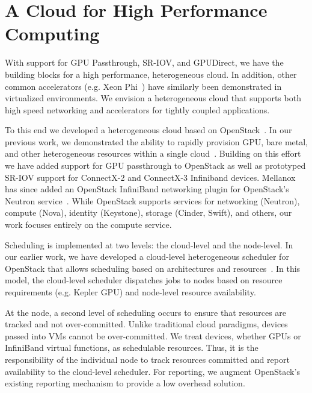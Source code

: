 \section{A Cloud for High Performance Computing}\label{openstack}
With support for GPU Passthrough, SR-IOV, and GPUDirect, we have the building
blocks for a high performance, heterogeneous cloud.  In addition, other common
accelerators (e.g. Xeon Phi~\cite{Phi}) have similarly been demonstrated in
virtualized environments.  We envision a heterogeneous cloud that supports
both high speed networking and accelerators for tightly coupled applications.

To this end we developed a heterogeneous cloud based on
OpenStack~\cite{www-openstack}.  In our previous work, we demonstrated the ability to rapidly provision GPU, bare metal, and other
heterogeneous resources within a single cloud~\cite{crago2011heterogeneous}.
Building on this effort we have added support for GPU passthrough to OpenStack
as well as prototyped SR-IOV support for ConnectX-2 and ConnectX-3 Infiniband devices.
Mellanox  has since added an OpenStack InfiniBand networking plugin for
OpenStack's Neutron service~\cite{ML2}. %
While OpenStack supports services for networking (Neutron), compute (Nova), identity
(Keystone), storage (Cinder, Swift), and others, our work focuses entirely
on the compute service.  

Scheduling is implemented at two levels: the cloud-level and the node-level.  In
our earlier work, we have developed a cloud-level heterogeneous scheduler for OpenStack that 
allows scheduling based on architectures and
resources~\cite{crago2011heterogeneous}.  In this model, the cloud-level
scheduler dispatches jobs to nodes based on resource requirements (e.g. Kepler
GPU) and node-level resource availability.

At the node, a second level of scheduling occurs to ensure that resources are
tracked and not over-committed.  Unlike traditional cloud paradigms, devices
passed into VMs cannot be over-committed.  We treat devices, whether GPUs or
InfiniBand virtual functions, as schedulable resources.  Thus, it is the responsibility of the
individual node to track resources committed and report availability to the
cloud-level scheduler.  For reporting, we augment OpenStack's
existing reporting mechanism to provide a low overhead solution.


